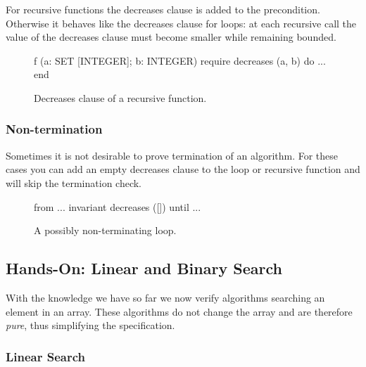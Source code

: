 For recursive functions the decreases clause is added to the precondition. Otherwise it behaves like the decreases clause for loops: at each recursive call the value of the decreases clause must become smaller while remaining bounded.

\begin{figure}
\begin{erunning}
f (a: SET [INTEGER]; b: INTEGER)
	require
		decreases (a, b)
	do ... end
\end{erunning}
\hspace{0.5cm}
\caption*{Decreases clause of a recursive function.}
\end{figure}

\subsubsection*{Non-termination}

Sometimes it is not desirable to prove termination of an algorithm. For these cases you can add an empty decreases clause to the loop or recursive function and \AutoProof will skip the termination check.

\begin{figure}
\begin{erunning}
from ...
invariant
	decreases ([])
until ...
\end{erunning}
\hspace{0.5cm}
\caption*{A possibly non-terminating loop.}
\end{figure}

\subsection{Hands-On: Linear and Binary Search}

With the knowledge we have so far we now verify algorithms searching an element in an array. These algorithms do not change the array and are therefore \emph{pure}, thus simplifying the specification.

\subsubsection*{Linear Search}

